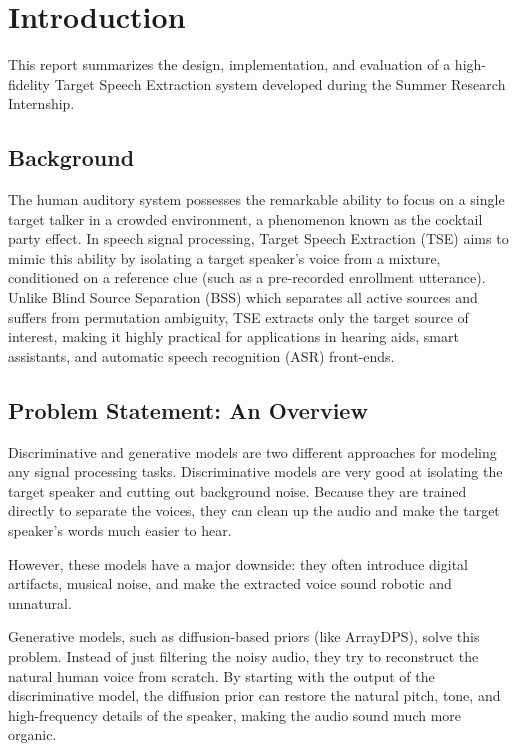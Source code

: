 \documentclass[conference]{IEEEtran}
\begin{document}
\section{Introduction}
This report summarizes the design, implementation, and evaluation of a high-fidelity Target Speech Extraction system developed during the Summer Research Internship.

\subsection{Background}
The human auditory system possesses the remarkable ability to focus on a single target talker in a crowded environment, a phenomenon known as the cocktail party effect\cite{cherry}. In speech signal processing, Target Speech Extraction (TSE) aims to mimic this ability by isolating a target speaker's voice from a mixture, conditioned on a reference clue (such as a pre-recorded enrollment utterance). Unlike Blind Source Separation (BSS) which separates all active sources and suffers from permutation ambiguity, TSE extracts only the target source of interest, making it highly practical for applications in hearing aids, smart assistants, and automatic speech recognition (ASR) front-ends.

\subsection{Problem Statement: An Overview}Discriminative and generative models are two different approaches for modeling any signal processing tasks. Discriminative models are very good at isolating the target speaker and cutting out background noise. Because they are trained directly to separate the voices, they can clean up the audio and make the target speaker's words much easier to hear.

However, these models have a major downside: they often introduce digital artifacts, musical noise, and make the extracted voice sound robotic and unnatural. 

Generative models, such as diffusion-based priors (like ArrayDPS), solve this problem. Instead of just filtering the noisy audio, they try to reconstruct the natural human voice from scratch. By starting with the output of the discriminative model, the diffusion prior can restore the natural pitch, tone, and high-frequency details of the speaker, making the audio sound much more organic.
\end{document}
